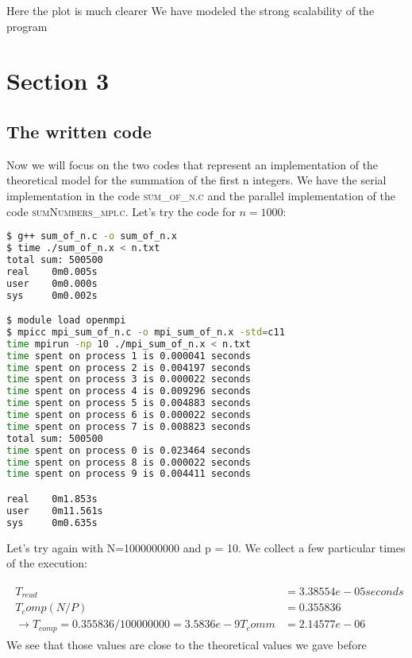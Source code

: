 \documentclass[11pt]{scrartcl} %
\begin{document}
Here the plot is much clearer
 We have modeled the strong scalability of the program

\section{Section 3}


\subsection{The written code}
Now we will focus on the two codes that represent an implementation of the theoretical model for the summation of the first n integers. We have the serial implementation in the code \textsc{sum\_of\_n.c} and the parallel implementation of the code \textsc{sumNumbers\_mpi.c}.
Let's try the code for $n=1000$:
\begin{lstlisting}[language=bash]
$ g++ sum_of_n.c -o sum_of_n.x
$ time ./sum_of_n.x < n.txt
total sum: 500500
real    0m0.005s
user    0m0.000s
sys     0m0.002s

$ module load openmpi
$ mpicc mpi_sum_of_n.c -o mpi_sum_of_n.x -std=c11
time mpirun -np 10 ./mpi_sum_of_n.x < n.txt
time spent on process 1 is 0.000041 seconds
time spent on process 2 is 0.004197 seconds
time spent on process 3 is 0.000022 seconds
time spent on process 4 is 0.009296 seconds
time spent on process 5 is 0.004883 seconds
time spent on process 6 is 0.000022 seconds
time spent on process 7 is 0.008823 seconds
total sum: 500500 
time spent on process 0 is 0.023464 seconds
time spent on process 8 is 0.000022 seconds
time spent on process 9 is 0.004411 seconds

real    0m1.853s
user    0m11.561s
sys     0m0.635s
\end{lstlisting}

Let's try again with N=1000000000 and p = 10. We collect a few particular times of the execution:

\begin{align} 
	\begin{split}
		T_{read}&= 3.38554 e-05 seconds\\
		T_comp (N/P)&= 0.355836\\
		\rightarrow T_{comp} = 0.355836/100000000 = 3.5836e-9
		T_comm&=2.14577e-06
	\end{split}					
\end{align}
 We see that those values are close to the theoretical values we gave before
\end{document}
